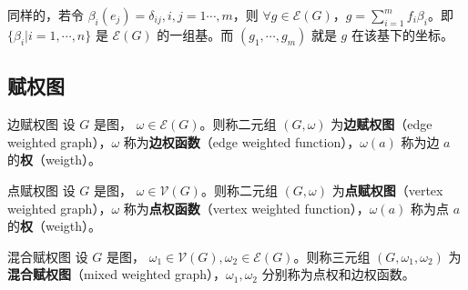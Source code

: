 同样的，若令 $\beta_i(e_j)=\delta_{ij},i,j=1\cdots,m$，则 $\forall g\in\mathcal E(G)$，$g=\sum\limits_{i=1}^m f_i\beta_i$。即 $\{\beta_i|i=1,\cdots,n\}$ 是 $\mathcal E(G)$ 的一组基。而 $(g_1,\cdots,g_m)$ 就是 $g$ 在该基下的坐标。

\subsection{赋权图}

\begin{definition}{边赋权图}
设 $G$ 是图， $\omega\in\mathcal E(G)$。则称二元组 $(G,\omega)$ 为\textbf{边赋权图}（edge weighted graph），$\omega$ 称为\textbf{边权函数}（edge weighted function），$\omega(a)$ 称为边 $a$ 的\textbf{权}（weigth）。
\end{definition}

\begin{definition}{点赋权图}
设 $G$ 是图， $\omega\in\mathcal V(G)$。则称二元组 $(G,\omega)$ 为\textbf{点赋权图}（vertex weighted graph），$\omega$ 称为\textbf{点权函数}（vertex weighted function），$\omega(a)$ 称为点 $a$ 的\textbf{权}（weigth）。
\end{definition}


\begin{definition}{混合赋权图}
设 $G$ 是图， $\omega_1\in\mathcal V(G),\omega_2\in\mathcal E(G)$。则称三元组 $(G,\omega_1,\omega_2)$ 为\textbf{混合赋权图}（mixed weighted graph），$\omega_1,\omega_2$ 分别称为点权和边权函数。
\end{definition}






